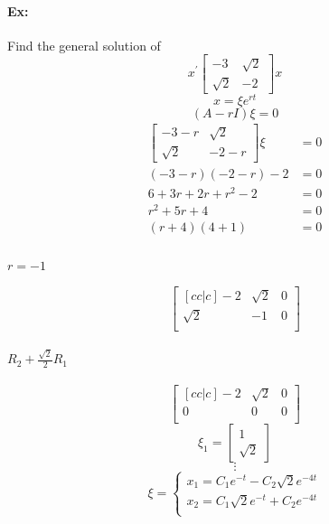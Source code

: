 \documentclass[letterpaper,12pt]{article}
\begin{document}
\paragraph{Ex:}Find the general solution of
\[
    x^{\prime}
    \begin{bmatrix}
        -3 & \sqrt{2}\\
        \sqrt{2} & -2
    \end{bmatrix}x
\]
\[
    x = \xi e^{rt}
\]
\[
    (A-rI)\xi = 0
\]
\begin{align*}
    \begin{bmatrix}
        -3 - r & \sqrt{2}\\
        \sqrt{2} & -2-r
    \end{bmatrix}\xi
    &= 0\\
    (-3-r)(-2-r)-2 &= 0 \\
    6 + 3r + 2r +r^2 - 2 &= 0\\
    r^2 + 5r +4 &= 0\\
    (r+4)(4+1) &= 0\\
\end{align*}
\paragraph{$r=-1$}
\makeatletter
\renewcommand*\env@matrix[1][*\c@MaxMatrixCols c]{%
\hskip -\arraycolsep
\let\@ifnextchar\new@ifnextchar
\array{#1}}
\makeatother

\[
\begin{bmatrix}[cc|c]
    -2 & \sqrt{2} & 0\\
    \sqrt{2} & -1 & 0\\
\end{bmatrix}
\]
\paragraph{$R_2+\frac{\sqrt{2}}{2}R_1$}
\[
\begin{bmatrix}[cc|c]
    -2 & \sqrt{2} & 0\\
    0 & 0 & 0\\
\end{bmatrix}
\]
$$\xi_1 = \begin{bmatrix}
    1 \\ \sqrt{2}
\end{bmatrix}$$
$$\vdots$$
\[ \xi = \begin{cases}
        x_1 = C_1e^{-t}-C_2\sqrt{2} e^{-4t}\\
        x_2 = C_1\sqrt{2} e^{-t}+C_2 e^{-4t}\\
    \end{cases}
\]
\end{document}
